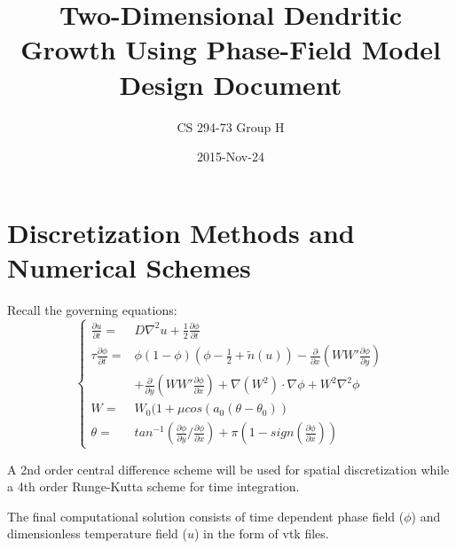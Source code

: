 \documentclass{article}
\title{Two-Dimensional Dendritic Growth Using Phase-Field Model \\ Design Document}
\date{2015-Nov-24}
\author{CS 294-73 Group H}
\begin{document}
\maketitle
    
\section{Discretization Methods and Numerical Schemes}
Recall the governing equations:
\begin{equation}
\begin{cases}
\frac{\partial u}{\partial t} =&D\nabla^2u+\frac{1}{2}\frac{\partial\phi}{\partial t} \\
\tau\frac{\partial \phi}{\partial t} =&  \phi(1-\phi)(\phi-\frac{1}{2}+\tilde{n}(u)) - \frac{\partial}{\partial x}(WW'\frac{\partial\phi}{\partial y})\\
&  + \frac{\partial}{\partial y}(WW'\frac{\partial\phi}{\partial x}) + \nabla(W^2)\cdot\nabla\phi + W^2\nabla^2\phi \\
W = & W_0(1+\mu cos(a_0(\theta-\theta_0)) \\
\theta = & tan^{-1}(\frac{\partial\phi}{\partial y}/\frac{\partial\phi}{\partial x}) + \pi(1-sign(\frac{\partial\phi}{\partial x})) 
\end{cases}
\end{equation}

A 2nd order central difference scheme will be used for spatial discretization while a 4th order Runge-Kutta scheme for time integration. 

The final computational solution consists of time dependent phase field ($\phi$) and dimensionless temperature field ($u$) in the form of vtk files.
\end{document}
